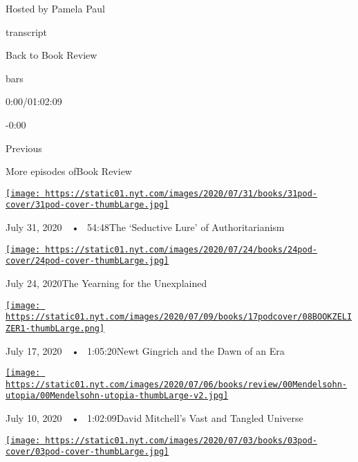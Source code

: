 Hosted by Pamela Paul

transcript

Back to Book Review

bars

0:00/01:02:09

-0:00

Previous

More episodes ofBook Review

\href{https://www.nytimes.com/2020/07/31/books/review/podcast-twilight-democracy-anne-applebaum-eat-buddha-barbara-demick.html?action=click\&module=audio-series-bar\&region=header\&pgtype=Article}{\texttt{[image: https://static01.nyt.com/images/2020/07/31/books/31pod-cover/31pod-cover-thumbLarge.jpg]}}

July 31, 2020~~•~ 54:48The `Seductive Lure' of Authoritarianism

\href{https://www.nytimes.com/2020/07/24/books/review/podcast-colin-dickey-unexplained-miles-harvey-king-of-confidence.html?action=click\&module=audio-series-bar\&region=header\&pgtype=Article}{\texttt{[image: https://static01.nyt.com/images/2020/07/24/books/24pod-cover/24pod-cover-thumbLarge.jpg]}}

July 24, 2020The Yearning for the Unexplained

\href{https://www.nytimes.com/2020/07/17/books/review/podcast-julian-zelizer-burning-down-house-newt-gingrich-notes-silencing-lacy-crawford.html?action=click\&module=audio-series-bar\&region=header\&pgtype=Article}{\texttt{[image: https://static01.nyt.com/images/2020/07/09/books/17podcover/08BOOKZELIZER1-thumbLarge.png]}}

July 17, 2020~~•~ 1:05:20Newt Gingrich and the Dawn of an Era

\href{https://www.nytimes.com/2020/07/10/books/review/david-mitchell-utopia-avenue-daniel-mendelsohn-biggest-bluff-poker-maria-konnikova.html?action=click\&module=audio-series-bar\&region=header\&pgtype=Article}{\texttt{[image: https://static01.nyt.com/images/2020/07/06/books/review/00Mendelsohn-utopia/00Mendelsohn-utopia-thumbLarge-v2.jpg]}}

July 10, 2020~~•~ 1:02:09David Mitchell's Vast and Tangled Universe

\href{https://www.nytimes.com/2020/07/03/books/review/podcast-jules-feiffer-smart-george-steve-inskeep-imperfect-union.html?action=click\&module=audio-series-bar\&region=header\&pgtype=Article}{\texttt{[image: https://static01.nyt.com/images/2020/07/03/books/03pod-cover/03pod-cover-thumbLarge.jpg]}}

